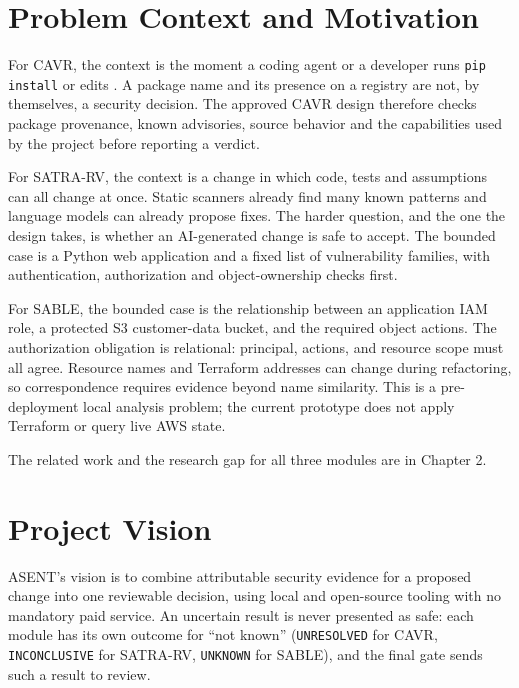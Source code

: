 \section{Problem Context and Motivation}
\begin{sloppypar}
For CAVR, the context is the moment a coding agent or a developer runs \texttt{pip install} or edits . A package name and its presence on a registry are not, by themselves, a security decision. The approved CAVR design therefore checks package provenance, known advisories, source behavior and the capabilities used by the project before reporting a verdict.
\end{sloppypar}

\begin{sloppypar}
For SATRA-RV, the context is a change in which code, tests and assumptions can all change at once. Static scanners already find many known patterns and language models can already propose fixes. The harder question, and the one the design takes, is whether an AI-generated change is safe to accept. The bounded case is a Python web application and a fixed list of vulnerability families, with authentication, authorization and object-ownership checks first.
\end{sloppypar}

\begin{sloppypar}
For SABLE, the bounded case is the relationship between an application IAM role, a protected S3 customer-data bucket, and the required object actions. The authorization obligation is relational: principal, actions, and resource scope must all agree. Resource names and Terraform addresses can change during refactoring, so correspondence requires evidence beyond name similarity. This is a pre-deployment local analysis problem; the current prototype does not apply Terraform or query live AWS state.
\end{sloppypar}

The related work and the research gap for all three modules are in Chapter 2.

\section{Project Vision}
\begin{sloppypar}
ASENT's vision is to combine attributable security evidence for a proposed change into one reviewable decision, using local and open-source tooling with no mandatory paid service. An uncertain result is never presented as safe: each module has its own outcome for ``not known'' (\texttt{UNRESOLVED} for CAVR, \texttt{INCONCLUSIVE} for SATRA-RV, \texttt{UNKNOWN} for SABLE), and the final gate sends such a result to review.
\end{sloppypar}

